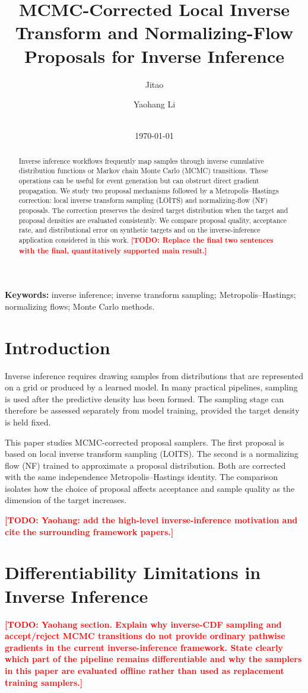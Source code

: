 \documentclass[11pt]{article}
\title{MCMC-Corrected Local Inverse Transform and Normalizing-Flow Proposals for Inverse Inference}
\author{
  Jitao \todo{family name} \and Yaohang Li
  \\
  \todo{Department, institution, city, country}\\
  \texttt{\todo{corresponding author email}}
}
\date{\today}
\newcommand{\todo}[1]{\textcolor{red}{\textbf{[TODO: #1]}}}
\newcommand{\methodloits}{\textsc{LOITS}}
\newcommand{\methodnf}{\textsc{NF}}
\begin{document}
\maketitle

\begin{abstract}
Inverse inference workflows frequently map samples through inverse cumulative distribution functions or Markov chain Monte Carlo (MCMC) transitions. These operations can be useful for event generation but can obstruct direct gradient propagation. We study two proposal mechanisms followed by a Metropolis--Hastings correction: local inverse transform sampling (\methodloits) and normalizing-flow (\methodnf) proposals. The correction preserves the desired target distribution when the target and proposal densities are evaluated consistently. We compare proposal quality, acceptance rate, and distributional error on synthetic targets and on the inverse-inference application considered in this work. \todo{Replace the final two sentences with the final, quantitatively supported main result.}
\end{abstract}

\noindent\textbf{Keywords:} inverse inference; inverse transform sampling; Metropolis--Hastings; normalizing flows; Monte Carlo methods.

\section{Introduction}
Inverse inference requires drawing samples from distributions that are represented on a grid or produced by a learned model. In many practical pipelines, sampling is used after the predictive density has been formed. The sampling stage can therefore be assessed separately from model training, provided the target density is held fixed.

This paper studies MCMC-corrected proposal samplers. The first proposal is based on local inverse transform sampling (\methodloits). The second is a normalizing flow (\methodnf) trained to approximate a proposal distribution. Both are corrected with the same independence Metropolis--Hastings identity. The comparison isolates how the choice of proposal affects acceptance and sample quality as the dimension of the target increases.

\todo{Yaohang: add the high-level inverse-inference motivation and cite the surrounding framework papers.}

\section{Differentiability Limitations in Inverse Inference}
\label{sec:differentiability}
\todo{Yaohang section. Explain why inverse-CDF sampling and accept/reject MCMC transitions do not provide ordinary pathwise gradients in the current inverse-inference framework. State clearly which part of the pipeline remains differentiable and why the samplers in this paper are evaluated offline rather than used as replacement training samplers.}
\end{document}
